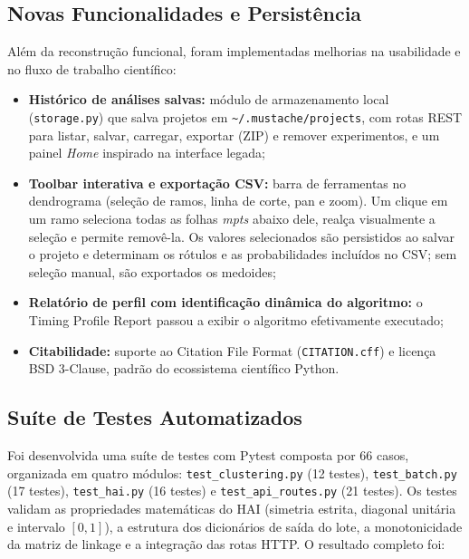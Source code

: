 \documentclass[12pt,a4paper,oneside]{article}
\begin{document}
\subsection{Novas Funcionalidades e Persistência}

Além da reconstrução funcional, foram implementadas melhorias na usabilidade e no fluxo de
trabalho científico:

\begin{itemize}
  \item \textbf{Histórico de análises salvas:} módulo de armazenamento local
        (\texttt{storage.py}) que salva projetos em \texttt{\textasciitilde/.mustache/projects},
        com rotas REST para listar, salvar, carregar, exportar (ZIP) e remover experimentos, e
        um painel \textit{Home} inspirado na interface legada;
  \item \textbf{Toolbar interativa e exportação CSV:} barra de ferramentas no dendrograma
        (seleção de ramos, linha de corte, pan e zoom). Um clique em um ramo seleciona todas as
        folhas \textit{mpts} abaixo dele, realça visualmente a seleção e permite removê-la. Os
        valores selecionados são persistidos ao salvar o projeto e determinam os rótulos e as
        probabilidades incluídos no CSV; sem seleção manual, são exportados os medoides;
  \item \textbf{Relatório de perfil com identificação dinâmica do algoritmo:} o Timing Profile
        Report passou a exibir o algoritmo efetivamente executado;
  \item \textbf{Citabilidade:} suporte ao Citation File Format (\texttt{CITATION.cff}) e
        licença BSD 3-Clause, padrão do ecossistema científico Python.
\end{itemize}

\subsection{Suíte de Testes Automatizados}

Foi desenvolvida uma suíte de testes com Pytest composta por 66 casos, organizada em quatro
módulos: \texttt{test\_clustering.py} (12 testes), \texttt{test\_batch.py} (17 testes),
\texttt{test\_hai.py} (16 testes) e \texttt{test\_api\_routes.py} (21 testes). Os testes validam
as propriedades matemáticas do HAI (simetria estrita, diagonal unitária e intervalo $[0,1]$), a
estrutura dos dicionários de saída do lote, a monotonicidade da matriz de linkage e a
integração das rotas HTTP. O resultado completo foi:
\end{document}
